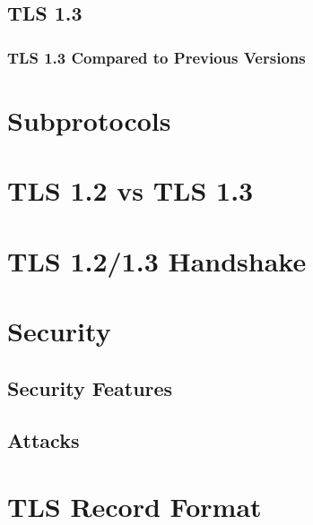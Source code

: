 \documentclass[11pt]{scrartcl} %
\begin{document}
\subsection{TLS 1.3}

\subsubsection{TLS 1.3 Compared to Previous Versions}

\section{Subprotocols}

\section{TLS 1.2 vs TLS 1.3}

\section{TLS 1.2/1.3 Handshake}

\section{Security}

\subsection{Security Features}

\subsection{Attacks}

\section{TLS Record Format}
\end{document}
